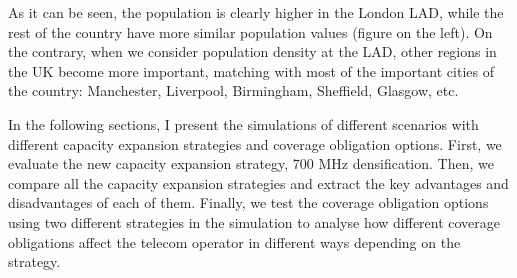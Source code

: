 
As it can be seen, the population is clearly higher in the London LAD, while the rest of the country have more similar population values (figure on the left). On the contrary, when we consider population density at the LAD, other regions in the UK become more important, matching with most of the important cities of the country: Manchester, Liverpool, Birmingham, Sheffield, Glasgow, etc. \par

In the following sections, I  present the simulations of different scenarios with different capacity expansion strategies and coverage obligation options. First, we evaluate the new capacity expansion strategy, 700 MHz densification. Then, we compare all the capacity expansion strategies and extract the key advantages and disadvantages of each of them. Finally, we test the coverage obligation options using two different strategies in the simulation to analyse how different coverage obligations affect the telecom operator in different ways depending on the strategy.\par




